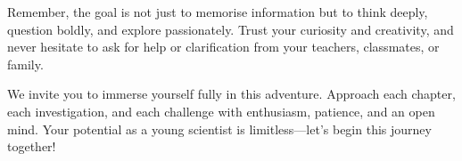 Remember, the goal is not just to memorise information but to think deeply, question boldly, and explore passionately. Trust your curiosity and creativity, and never hesitate to ask for help or clarification from your teachers, classmates, or family.

 We invite you to immerse yourself fully in this adventure. Approach each chapter, each investigation, and each challenge with enthusiasm, patience, and an open mind. Your potential as a young scientist is limitless—let’s begin this journey together!